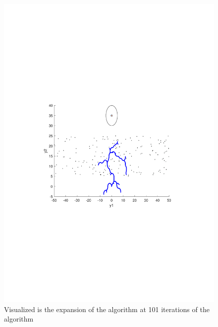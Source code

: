 \begin{figure}[!t]
  \newline
  \begin{minipage}[c]{.9\columnwidth}
    \includegraphics[scale=.5, trim={5cm, 9cm, 5cm, 7cm}, clip]{figures/experiments/rrtfunnel-101samples-dyn.pdf}
  \caption[The expansion of the \rrtfunnel algorithm at 1, and 101 iterations]{Visualized is the expansion of the \rrtfunnel algorithm at 101 iterations of the algorithm}
  \end{minipage}
\end{figure}

